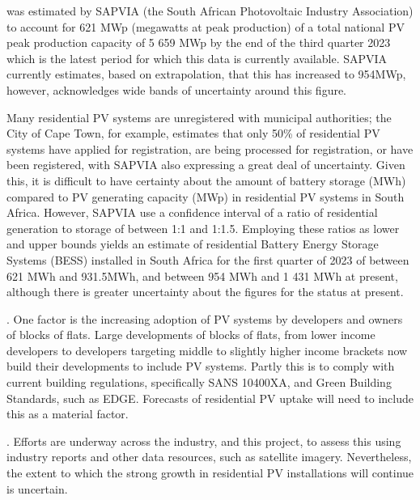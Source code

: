 \documentclass[letterpaper,10pt,english]{jupyterBook}
\begin{document}
\sphinxAtStartPar
{} was estimated by SAPVIA (the South African Photovoltaic Industry Association) to account for 621 MWp (megawatts at peak production) of a total national PV peak production capacity of 5 659 MWp by the end of the third quarter 2023 which is the latest period for which this data is currently available. SAPVIA currently estimates, based on extrapolation, that this has increased to 954MWp, however, acknowledges wide bands of uncertainty around this figure.

\sphinxAtStartPar
Many residential PV systems are unregistered with municipal authorities; the City of Cape Town, for example, estimates that only 50\% of residential PV systems have applied for registration, are being processed for registration, or have been registered, with SAPVIA also expressing a great deal of uncertainty. Given this, it is difficult to have certainty about the amount of battery storage (MWh) compared to PV generating capacity (MWp) in residential PV systems in South Africa. However, SAPVIA use a confidence interval of a ratio of residential generation to storage of between 1:1 and 1:1.5. Employing these ratios as lower and upper bounds yields an estimate of residential Battery Energy Storage Systems (BESS) installed in South Africa for the first quarter of 2023 of between 621 MWh and 931.5MWh, and between 954 MWh and 1 431 MWh at present, although there is greater uncertainty about the figures for the status at present.

\sphinxAtStartPar
{}. One factor is the increasing adoption of PV systems by developers and owners of blocks of flats. Large developments of blocks of flats, from lower income developers to developers targeting middle to slightly higher income brackets now build their developments to include PV systems. Partly this is to comply with current building regulations, specifically SANS 10400XA, and Green Building Standards, such as EDGE. Forecasts of residential PV uptake will need to include this as a material factor.

\sphinxAtStartPar
{}. Efforts are underway across the industry, and this project, to assess this using industry reports and other data resources, such as satellite imagery. Nevertheless, the extent to which the strong growth in residential PV installations will continue is uncertain.
\end{document}
